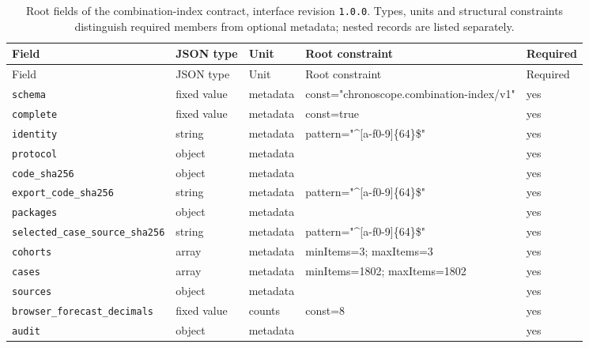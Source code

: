 \begingroup\small
\begin{longtable}{@{}p{}p{}p{}p{}p{}@{}}
\caption{Root fields of the combination-index contract, interface revision \texttt{1.0.0}. Types, units and structural constraints distinguish required members from optional metadata; nested records are listed separately.}\label{tab:contract-combination-index}\\
\toprule Field & JSON type & Unit & Root constraint & Required\\\midrule\endfirsthead
\toprule Field & JSON type & Unit & Root constraint & Required\\\midrule\endhead
\texttt{schema} & fixed value & metadata & const="chronosco\allowbreak{}pe.combination-i\allowbreak{}ndex/v1" & yes\\
\texttt{complete} & fixed value & metadata & const=true & yes\\
\texttt{identity} & string & metadata & pattern="\textasciicircum{}[a-f0-9]\{64\}\$" & yes\\
\texttt{protocol} & object & metadata &  & yes\\
\texttt{code\_\allowbreak{}sha256} & object & metadata &  & yes\\
\texttt{export\_\allowbreak{}code\_\allowbreak{}sha256} & string & metadata & pattern="\textasciicircum{}[a-f0-9]\{64\}\$" & yes\\
\texttt{packages} & object & metadata &  & yes\\
\texttt{selected\_\allowbreak{}case\_\allowbreak{}source\_\allowbreak{}sha256} & string & metadata & pattern="\textasciicircum{}[a-f0-9]\{64\}\$" & yes\\
\texttt{cohorts} & array & metadata & minItems=3; maxItems=3 & yes\\
\texttt{cases} & array & metadata & minItems=1802; maxItems=1802 & yes\\
\texttt{sources} & object & metadata &  & yes\\
\texttt{browser\_\allowbreak{}forecast\_\allowbreak{}decimals} & fixed value & counts & const=8 & yes\\
\texttt{audit} & object & metadata &  & yes\\
\bottomrule
\end{longtable}
\endgroup
